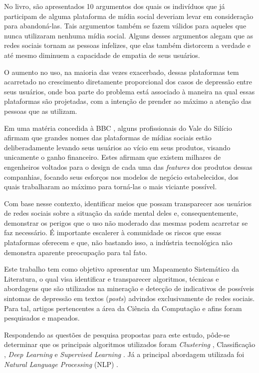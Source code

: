 \documentclass[conference]{IEEEtran}
\begin{document}
No livro, são apresentados 10 argumentos dos quais os indivíduos que já participam de alguma plataforma de mídia social deveriam levar em consideração para abandoná-las. Tais argumentos também se fazem válidos para aqueles que nunca utilizaram nenhuma mídia social. Alguns desses argumentos alegam que as redes sociais tornam as pessoas infelizes, que elas também distorcem a verdade e até mesmo diminuem a capacidade de empatia de seus usuários.

O aumento no uso, na maioria das vezes exacerbado, dessas plataformas tem acarretado no crescimento diretamente proporcional dos casos de depressão entre seus usuários, onde boa parte do problema está associado à maneira na qual essas plataformas são projetadas, com a intenção de prender ao máximo a atenção das pessoas que as utilizam.

Em uma matéria concedida à BBC \cite{BBC}, alguns profissionais do Vale do Silício afirmam que grandes nomes das plataformas de mídias sociais estão deliberadamente levando seus usuários ao vício em seus produtos, visando unicamente o ganho financeiro. Estes afirmam que existem milhares de engenheiros voltados para o design de cada uma das \textit{features} dos produtos dessas companhias, focando seus esforços nos modelos de negócio estabelecidos, dos quais trabalharam ao máximo para torná-las o mais viciante possível.

Com base nesse contexto, identificar meios que possam transparecer aos usuários de redes sociais sobre a situação da saúde mental deles e, consequentemente, demonstrar os perigos que o uso não moderado das mesmas podem acarretar se faz necessário. É importante escalerer à comunidade os riscos que essas plataformas oferecem e que, não bastando isso, a indústria tecnológica não demonstra aparente preocupação para tal fato.

Este trabalho tem como objetivo apresentar um Mapeamento Sistemático da Literatura, o qual visa identificar e transparecer algoritmos, técnicas e abordagens que são utilizados na mineração e detecção de indicativos de possíveis sintomas de depressão em textos (\textit{posts}) advindos exclusivamente de redes sociais. Para tal, artigos pertencentes a área da Ciência da Computação e afins foram pesquisados e mapeados.

Respondendo as questões de pesquisa propostas para este estudo, pôde-se determinar que os principais algoritmos utilizados foram \textit{Clustering} \cite{ArtigoN1, ArtigoN4, ArtigoN5}, Classificação \cite{ArtigoN2, ArtigoN3}, \textit{Deep Learning} \cite{ArtigoN3} e \textit{Supervised Learning} \cite{ArtigoN1, ArtigoN2}. Já a principal abordagem utilizada foi \textit{Natural Language Processing} (NLP) \cite{ArtigoN3, ArtigoN2, ArtigoN4, ArtigoN6, ArtigoN9, ArtigoN10}.
\end{document}
